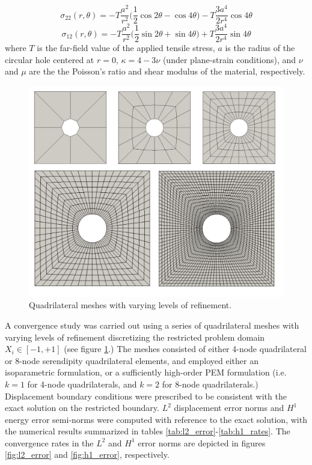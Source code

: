 \begin{equation}
  \sigma_{22} (r, \theta) = - T \frac{a^2}{r^2} \bigg( \frac{1}{2} \cos 2 \theta - \cos 4 \theta \bigg) - T \frac{3a^4}{2r^4} \cos 4 \theta
\end{equation}
\begin{equation}
  \sigma_{12} (r, \theta) = - T \frac{a^2}{r^2} \bigg( \frac{1}{2} \sin 2 \theta + \sin 4 \theta \bigg) + T \frac{3a^4}{2r^4} \sin 4 \theta
\end{equation}
where $T$ is the far-field value of the applied tensile stress, $a$ is the radius of the circular hole centered at $r=0$, $\kappa = 4 - 3\nu$ (under plane-strain conditions), and $\nu$ and $\mu$ are the the Poisson's ratio and shear modulus of the material, respectively.

\begin{figure}[!h]
  \centering
  \includegraphics[width=6.0in]{figures/plate_with_hole_meshes.pdf}
  \caption{Quadrilateral meshes with varying levels of refinement.}
  \label{fig:plate_with_hole_meshes}
\end{figure}
A convergence study was carried out using a series of quadrilateral meshes with varying levels of refinement discretizing the restricted problem domain $X_i \in [ -1, +1]$ (see figure \ref{fig:plate_with_hole_meshes}.) The meshes consisted of either 4-node quadrilateral or 8-node serendipity quadrilateral elements, and employed either an isoparametric formulation, or a sufficiently high-order PEM formulation (i.e. $k=1$ for 4-node quadrilaterals, and $k=2$ for 8-node quadrilaterals.) Displacement boundary conditions were prescribed to be consistent with the exact solution on the restricted boundary. $L^2$ displacement error norms and $H^1$ energy error semi-norms were computed with reference to the exact solution, with the numerical results summarized in tables \ref{tab:l2_error}-\ref{tab:h1_rates}. The convergence rates in the $L^2$ and $H^1$ error norms are depicted in figures \ref{fig:l2_error} and \ref{fig:h1_error}, respectively.
